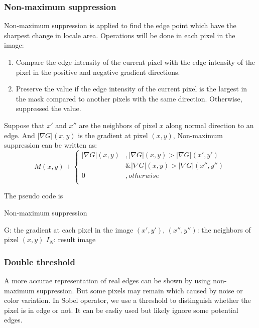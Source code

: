 \documentclass[10pt,twocolumn,letterpaper]{article}
\begin{document}
\subsubsection{Non-maximum suppression}

Non-maximum suppression is applied to find the edge point which have the sharpest 
change in locale area. Operations will be done in each pixel in the image: 
\begin{enumerate}[noitemsep]
\item Compare the edge intensity of the current pixel with the edge intensity of 
the pixel in the positive and negative gradient directions. 
\item Preserve the value if the edge intensity of the current pixel is the largest 
in the mask compared to another pixels with the same direction. Otherwise, suppressed 
the value. 
\end{enumerate}

Suppose that $x'$ and $x''$ are the neighbors of pixel $x$ along normal direction 
to an edge.\cite{ref13} And $|\nabla G|(x, y)$ is the gradient at pixel $(x, y)$, 
Non-maximum suppression can be written as: 
$$
M(x, y) + 
	\begin{cases}
		|\nabla G|(x, y)&, |\nabla G|(x, y) > |\nabla G|(x', y') \\
		& \& |\nabla G|(x, y) > |\nabla G|(x'', y'') \\
		0&, otherwise \\
	\end{cases}
$$

The pseudo code is 
\begin{algorithm}
	\caption{Non-maximum suppression}
	\begin{algorithmic}[1]
		\Require G: the gradient at each pixel in the image
		\Require $(x', y')$, $(x'', y'')$: the neighbors of pixel $(x, y)$
		\Ensure $I_N$: result image
			\Else
			\EndIf
		\EndFor
	\end{algorithmic}
\end{algorithm}

\subsubsection{Double threshold}

A more accurae representation of real edges can be shown by using non-maximum 
suppression. But some pixels may remain which caused by noise or color variation. 
In Sobel operator, we use a threshold to distinguish whether the pixel is in edge 
or not. It can be easliy used but likely ignore some potential edges. 
\end{document}
